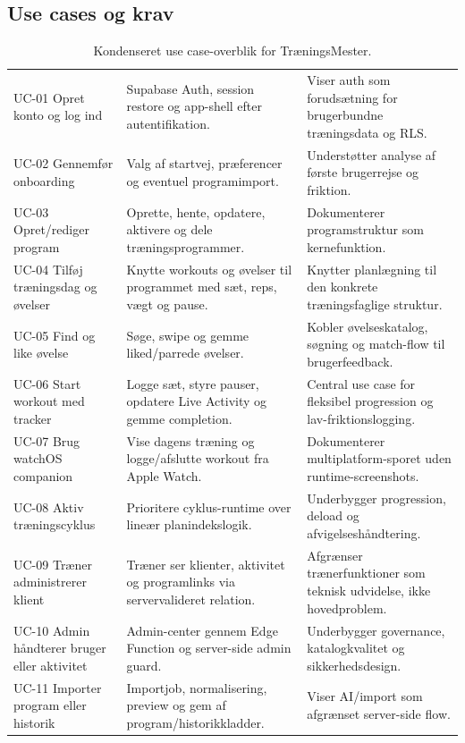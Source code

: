 \clearpage

\subsection{Use cases og krav}

\begin{table}[htbp]
\footnotesize
\renewcommand{\arraystretch}{1.12}
\begin{tabularx}{\textwidth}{>{\RaggedRight\arraybackslash}p{} >{\RaggedRight\arraybackslash}p{} Y}
\toprule
{} &  &  \\
\midrule
UC-01 Opret konto og log ind & Supabase Auth, session restore og app-shell efter autentifikation. & Viser auth som forudsætning for brugerbundne træningsdata og RLS. \\
UC-02 Gennemfør onboarding & Valg af startvej, præferencer og eventuel programimport. & Understøtter analyse af første brugerrejse og friktion. \\
UC-03 Opret/rediger program & Oprette, hente, opdatere, aktivere og dele træningsprogrammer. & Dokumenterer programstruktur som kernefunktion. \\
UC-04 Tilføj træningsdag og øvelser & Knytte workouts og øvelser til programmet med sæt, reps, vægt og pause. & Knytter planlægning til den konkrete træningsfaglige struktur. \\
UC-05 Find og like øvelse & Søge, swipe og gemme liked/parrede øvelser. & Kobler øvelseskatalog, søgning og match-flow til brugerfeedback. \\
UC-06 Start workout med tracker & Logge sæt, styre pauser, opdatere Live Activity og gemme completion. & Central use case for fleksibel progression og lav-friktionslogging. \\
UC-07 Brug watchOS companion & Vise dagens træning og logge/afslutte workout fra Apple Watch. & Dokumenterer multiplatform-sporet uden runtime-screenshots. \\
UC-08 Aktiv træningscyklus & Prioritere cyklus-runtime over lineær planindekslogik. & Underbygger progression, deload og afvigelseshåndtering. \\
UC-09 Træner administrerer klient & Træner ser klienter, aktivitet og programlinks via servervalideret relation. & Afgrænser trænerfunktioner som teknisk udvidelse, ikke hovedproblem. \\
UC-10 Admin håndterer bruger eller aktivitet & Admin-center gennem Edge Function og server-side admin guard. & Underbygger governance, katalogkvalitet og sikkerhedsdesign. \\
UC-11 Importer program eller historik & Importjob, normalisering, preview og gem af program/historikkladder. & Viser AI/import som afgrænset server-side flow. \\
\bottomrule
\end{tabularx}
\caption{Kondenseret use case-overblik for TræningsMester.}
\label{tab:tm-use-cases}
\end{table}

